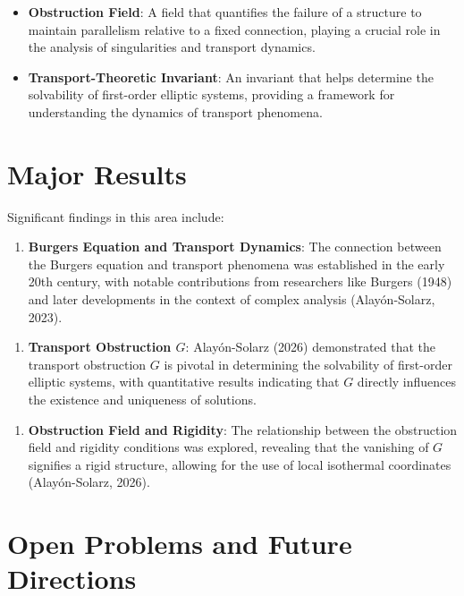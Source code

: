 \documentclass[11pt,a4paper]{article}
\begin{document}
\begin{itemize}
\item \textbf{Obstruction Field}: A field that quantifies the failure of a structure to maintain parallelism relative to a fixed connection, playing a crucial role in the analysis of singularities and transport dynamics.
\end{itemize}

\begin{itemize}
\item \textbf{Transport-Theoretic Invariant}: An invariant that helps determine the solvability of first-order elliptic systems, providing a framework for understanding the dynamics of transport phenomena.
\end{itemize}

\section{Major Results}

Significant findings in this area include:

\begin{enumerate}
\item \textbf{Burgers Equation and Transport Dynamics}: The connection between the Burgers equation and transport phenomena was established in the early 20th century, with notable contributions from researchers like Burgers (1948) and later developments in the context of complex analysis (Alayón-Solarz, 2023).
\end{enumerate}

\begin{enumerate}
\item \textbf{Transport Obstruction \( G \)}: Alayón-Solarz (2026) demonstrated that the transport obstruction \( G \) is pivotal in determining the solvability of first-order elliptic systems, with quantitative results indicating that \( G \) directly influences the existence and uniqueness of solutions.
\end{enumerate}

\begin{enumerate}
\item \textbf{Obstruction Field and Rigidity}: The relationship between the obstruction field and rigidity conditions was explored, revealing that the vanishing of \( G \) signifies a rigid structure, allowing for the use of local isothermal coordinates (Alayón-Solarz, 2026).
\end{enumerate}

\section{Open Problems and Future Directions}
\end{document}
